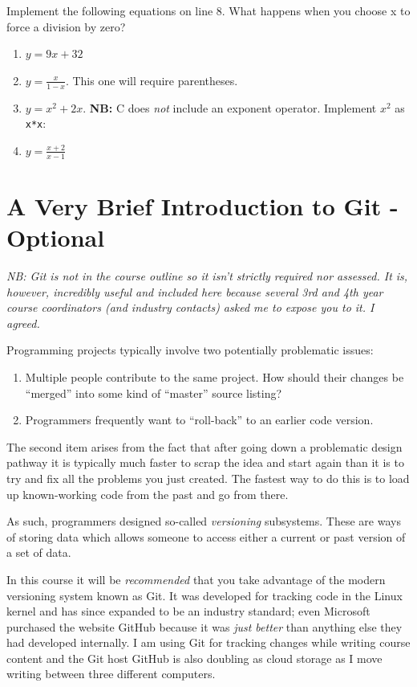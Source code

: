 \documentclass{lab}
\begin{document}
\begin{task}{}{}
Implement the following equations on line 8. What happens when you choose x to force a division by zero?

\begin{enumerate}
\item $y = 9x + 32$
\item $y = \frac{x}{1 - x}$.  This one will require parentheses.
\item $y = x^2 + 2x$. \textbf{NB:} C does \textit{not} include an exponent operator. Implement $x^2$ as \texttt{x*x}:
\item $y = \frac{x + 2}{x - 1}$
\end{enumerate}
\end{task}
\pagebreak
\section{A Very Brief Introduction to Git - Optional}

\textit{NB: Git is not in the course outline so it isn't strictly required nor assessed. It is, however, incredibly useful and included here because several 3rd and 4th year course coordinators (and industry contacts) asked me to expose you to it. I agreed.}

Programming projects typically involve two potentially problematic issues:

\begin{enumerate}
	\item Multiple people contribute to the same project. How should their changes be ``merged'' into some kind of ``master'' source listing?
	\item Programmers frequently want to ``roll-back'' to an earlier code version.
\end{enumerate}

The second item arises from the fact that after going down a problematic design pathway it is typically much faster to scrap the idea and start again than it is to try and fix all the problems you just created. The fastest way to do this is to load up known-working code from the past and go from there.

As such, programmers designed so-called \textit{versioning} subsystems. These are ways of storing data which allows someone to access either a current or past version of a set of data.

In this course it will be \textit{recommended} that you take advantage of the modern versioning system known as Git. It was developed for tracking code in the Linux kernel and has since expanded to be an industry standard; even Microsoft purchased the website GitHub because it was \textit{just better} than anything else they had developed internally. I am using Git for tracking changes while writing course content and the Git host GitHub is also doubling as cloud storage as I move writing between three different computers.
\end{document}
